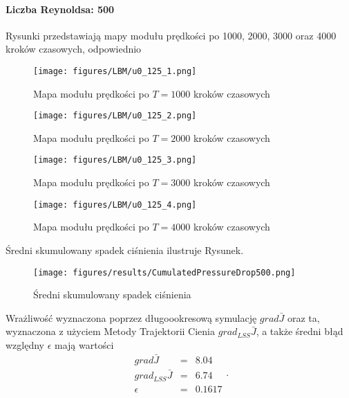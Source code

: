 \documentclass[12pt]{article}
\begin{document}
\paragraph{Liczba Reynoldsa: 500}
Rysunki przedstawiają mapy modułu prędkości po 1000, 2000, 3000 oraz 4000 kroków czasowych, odpowiednio 
\begin{figure}[H]
	\texttt{[image: figures/LBM/u0\_125\_1.png]} 
	\caption{Mapa modułu prędkości po $ T=1000 $ kroków czasowych}
\end{figure}
\begin{figure}[H]
	\texttt{[image: figures/LBM/u0\_125\_2.png]} 
	\caption{Mapa modułu prędkości po $ T=2000 $ kroków czasowych}
\end{figure}
\begin{figure}[H]
	\texttt{[image: figures/LBM/u0\_125\_3.png]} 
	\caption{Mapa modułu prędkości po $ T=3000 $ kroków czasowych}
\end{figure}
\begin{figure}[H]
	\texttt{[image: figures/LBM/u0\_125\_4.png]} 
	\caption{Mapa modułu prędkości po $ T=4000 $ kroków czasowych}
\end{figure}
Średni skumulowany spadek ciśnienia ilustruje Rysunek.
\begin{figure}[H]
	\texttt{[image: figures/results/CumulatedPressureDrop500.png]} 
	\centering
	\caption{Średni skumulowany spadek ciśnienia}
\end{figure}
Wrażliwość wyznaczona poprzez długoookresową symulację $ grad\bar{J} $ oraz ta, wyznaczona z użyciem Metody Trajektorii Cienia $ grad_{LSS}\bar{J} $, a także średni błąd względny $ \epsilon $ mają wartości
\begin{equation}
\begin{array}{rcl}
grad\bar{J} &=& 8.04 \\
grad_{LSS}\bar{J} &=& 6.74 \\
\epsilon &=& 0.1617 
\end{array}.
\label{results500}
\end{equation} 
\end{document}
